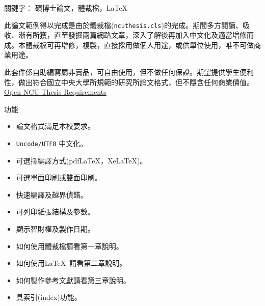 \begin{abstractcn}


關鍵字： 碩博士論文，體裁檔，\LaTeX
\vspace{2em}

此論文範例得以完成是由於體裁檔({\tt ncuthesis.cls})的完成。期間多方閱讀、吸收、漸有所獲，直至發掘兩篇網路文章，深入了解後再加入中文化及適當增修而成。本體裁檔可再增修，複製，直接採用做個人用途，或供單位使用，唯不可做商業用途。

此套件係自助編寫屬非賣品，可自由使用，但不做任何保證。期望提供學生便利性，做出符合國立中央大學所規範的研究所論文格式，但不隱含任何商業價值。\href{./form03-02-02.doc}{Open NCU Thesis Requirements}
\begin{center}
功能
\end{center}
\begin{itemize}
\item 論文格式滿足本校要求。
\item {\tt Uncode/UTF8} 中文化。
\item 可選擇編譯方式(pdf\LaTeX，Xe\LaTeX)。
\item 可選單面印刷或雙面印刷。
\item 快速編譯及越界偵錯。
\item 可列印紙張結構及參數。
\item 顯示智財權及製作日期。
\item 如何使用體裁檔請看第一章說明。
\item 如何使用\LaTeX\ 請看第二章說明。
\item 如何製作參考文獻請看第三章說明。
\item 具索引(index)功能。
\end{itemize}
\end{abstractcn} 